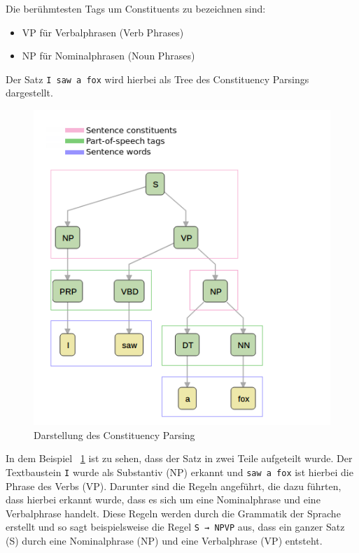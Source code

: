 Die berühmtesten Tags um Constituents zu bezeichnen sind:

\begin{itemize}
    \item VP für Verbalphrasen (Verb Phrases)
    \item NP für Nominalphrasen (Noun Phrases)
\end{itemize}

Der Satz \texttt{I saw a fox} wird hierbei als Tree des Constituency Parsings dargestellt.

\begin{figure}[hbt!]
    \centering
    \includegraphics[scale=0.5]{pics/constituency_parse_tree}
    \caption{Darstellung des Constituency Parsing~\cite{dependencyVsConstituencyParsing}}
    \label{fig:constituency_parsing_tree}
\end{figure}

In dem Beispiel ~\ref{fig:constituency_parsing_tree} ist zu sehen, dass der Satz in zwei Teile aufgeteilt wurde.
Der Textbaustein \texttt{I} wurde als Substantiv (NP) erkannt und \texttt{saw a fox} ist hierbei die Phrase des Verbs (VP).
Darunter sind die Regeln angeführt, die dazu führten, dass hierbei erkannt wurde, dass es sich um eine Nominalphrase und eine Verbalphrase handelt.
Diese Regeln werden durch die Grammatik der Sprache erstellt und so sagt beispielsweise die Regel \texttt{S → NPVP} aus, dass ein ganzer Satz (S) durch eine Nominalphrase (NP) und eine Verbalphrase (VP) entsteht.\cite{dependencyVsConstituencyParsing}

